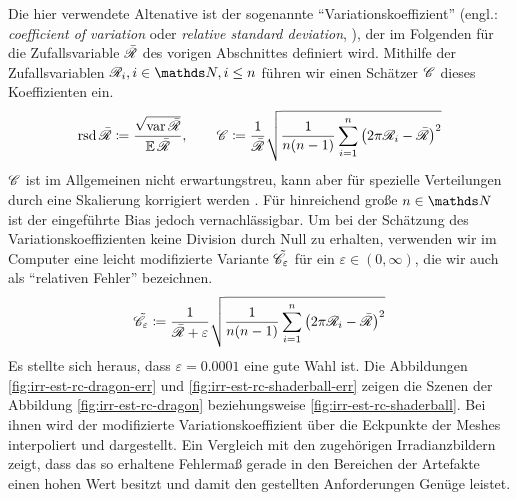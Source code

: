		Die hier verwendete Altenative ist der sogenannte \enquote{Variationskoeffizient} (engl.: \textit{coefficient of variation} oder \textit{relative standard deviation}, \cite{coeff-of-variation}), der im Folgenden für die Zufallsvariable $\bar{\mathscr{R}}$ des vorigen Abschnittes definiert wird.
		Mithilfe der Zufallsvariablen $\e{R}_i,i\in\SN,i\leq n$ führen wir einen Schätzer $\mathscr{C}$ dieses Koeffizienten ein.
		\[
			\operatorname{rsd} \bar{\mathscr{R}} \coloneqq \frac{\sqrt{\operatorname{var} \bar{\mathscr{R}}}}{\operatorname{\mathbb{E}} \bar{\mathscr{R}}},\qquad \mathscr{C} \coloneqq \frac{1}{ \bar{\mathscr{R}} } \sqrt{\frac{1}{n(n-1)}\sum_{i=1}^n \left( 2\pi\mathscr{R}_i - \bar{\mathscr{R}} \right)^2}
		\]
		$\mathscr{C}$ ist im Allgemeinen nicht erwartungstreu, kann aber für spezielle Verteilungen durch eine Skalierung korrigiert werden \cite{coeff-of-variation}.
		Für hinreichend große $n\in\SN$ ist der eingeführte Bias jedoch vernachlässigbar.
		Um bei der Schätzung des Variationskoeffizienten keine Division durch Null zu erhalten, verwenden wir im Computer eine leicht modifizierte Variante $\tilde{\mathscr{C}}_\varepsilon$ für ein $\varepsilon\in(0,\infty)$, die wir auch als \enquote{relativen Fehler} bezeichnen.
		\[
			\tilde{\mathscr{C}}_\varepsilon \coloneqq \frac{1}{ \bar{\mathscr{R}} + \varepsilon } \sqrt{\frac{1}{n(n-1)}\sum_{i=1}^n \left( 2\pi\mathscr{R}_i - \bar{\mathscr{R}} \right)^2}
		\]
		Es stellte sich heraus, dass $\varepsilon = 0.0001$ eine gute Wahl ist.
		Die Abbildungen \ref{fig:irr-est-rc-dragon-err} und \ref{fig:irr-est-rc-shaderball-err} zeigen die Szenen der Abbildung \ref{fig:irr-est-rc-dragon} beziehungsweise \ref{fig:irr-est-rc-shaderball}.
		Bei ihnen wird der modifizierte Variationskoeffizient über die Eckpunkte der Meshes interpoliert und dargestellt.
		Ein Vergleich mit den zugehörigen Irradianzbildern zeigt, dass das so erhaltene Fehlermaß gerade in den Bereichen der Artefakte einen hohen Wert besitzt und damit den gestellten Anforderungen Genüge leistet.

